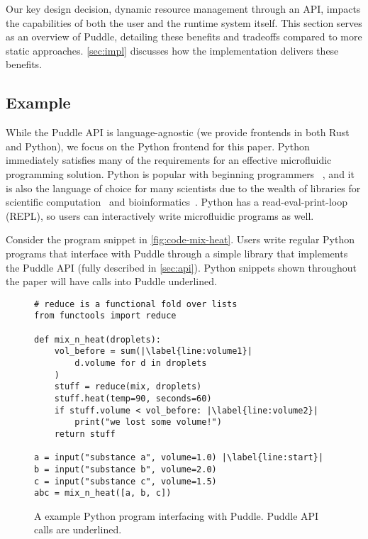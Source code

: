 \documentclass[sigconf, screen]{acmart}
\newcommand\mw[2][]{\todo[color=blue!20, #1]{\sf #2}}
\begin{document}
Our key design decision, dynamic resource management through an API, impacts the capabilities of both the user and the runtime system itself.
This section serves as an overview of Puddle, detailing these benefits and tradeoffs compared to more static approaches.
\autoref{sec:impl} discusses how the implementation delivers these benefits.

\subsection{Example}

While the Puddle API is language-agnostic (we provide frontends in both Rust and Python), we focus on the Python frontend for this paper.
Python immediately satisfies many of the requirements for an effective microfluidic programming solution.
Python is popular with beginning programmers ~\cite{python-intro}, and it is also the language of choice for many scientists due to the wealth of libraries for scientific computation~\cite{scipy} and bioinformatics~\cite{biopython}.
Python has a read-eval-print-loop (REPL), so users can interactively write microfluidic programs as well.

Consider the program snippet in \autoref{fig:code-mix-heat}.
Users write regular Python programs that interface with Puddle through a simple library that implements the Puddle API (fully described in \autoref{sec:api}).
Python snippets shown throughout the paper will have calls into Puddle underlined.

\begin{figure}
  \centering
\begin{lstlisting}[emphstyle=\underline, deletekeywords={temperature}]
# reduce is a functional fold over lists
from functools import reduce

def mix_n_heat(droplets):
    vol_before = sum(|\label{line:volume1}|
        d.volume for d in droplets
    )
    stuff = reduce(mix, droplets)
    stuff.heat(temp=90, seconds=60)
    if stuff.volume < vol_before: |\label{line:volume2}|
        print("we lost some volume!")
    return stuff

a = input("substance a", volume=1.0) |\label{line:start}|
b = input("substance b", volume=2.0)
c = input("substance c", volume=1.5)
abc = mix_n_heat([a, b, c])
\end{lstlisting}

  \caption{
    A example Python program interfacing with Puddle.
    Puddle API calls are underlined.
  }
  \label{fig:code-mix-heat}
\end{figure}
\end{document}

